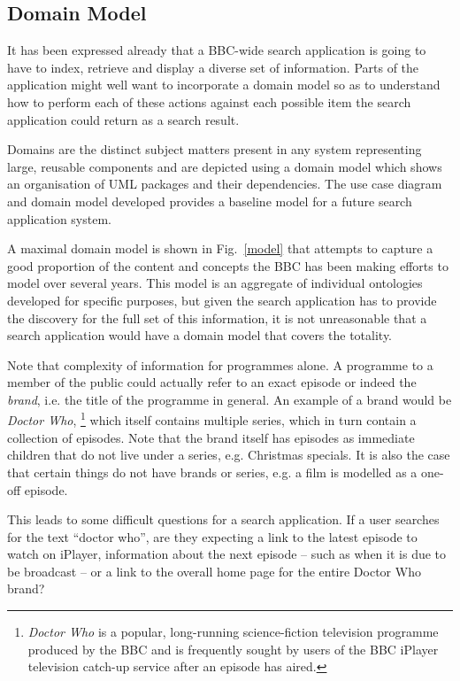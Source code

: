 \documentclass{llncs}
\begin{document}
\subsection{Domain Model}

It has been expressed already that a BBC-wide search application
is going to have to index, retrieve and display a diverse set of
information. Parts of the application might well want to incorporate
a domain model\cite{fowler2002patterns} so as to understand how
to perform each of these actions against each possible item
the search application could return as a search result.

Domains are the distinct subject matters present in any system
representing large, reusable components and are depicted using a
domain model which shows an organisation of UML packages and their
dependencies.\cite{dickerson2009architecture} The use case diagram and domain model
developed provides a baseline model for a future search application system.

A maximal
domain model is shown in Fig.~\ref{model} that attempts to capture
a good proportion of the content and concepts the BBC has
been making efforts to model over several years. This model is
an aggregate of individual ontologies developed for specific purposes,
but given the search application has to provide the discovery for
the full set of this information, it is not unreasonable that
a search application would have a domain model that covers the totality.

Note that complexity of information for programmes alone.\cite{raimond2009bbc}
A programme to a member of the public could actually refer to an
exact episode or indeed the \emph{brand}, i.e. the title of the programme
in general. An example of a brand would be
\emph{Doctor Who},
\footnote{\emph{Doctor Who} is a popular, long-running science-fiction
television programme produced by the BBC and is frequently sought by users
of the BBC iPlayer television catch-up service after an episode has aired.
} which itself contains multiple series, which in turn
contain a collection of episodes. Note that the brand itself has episodes
as immediate children that do not live under a series, e.g. Christmas specials.
It is also the case that certain things do not have brands or series, e.g.
a film is modelled as a one-off episode.

This leads to some difficult questions for a search application. If a user
searches for the text ``doctor who'',
are they expecting a link to the
latest episode to watch on iPlayer, information about the next episode
-- such as when it is due to be broadcast -- or a link to the overall
home page for the entire Doctor Who brand?
\end{document}
